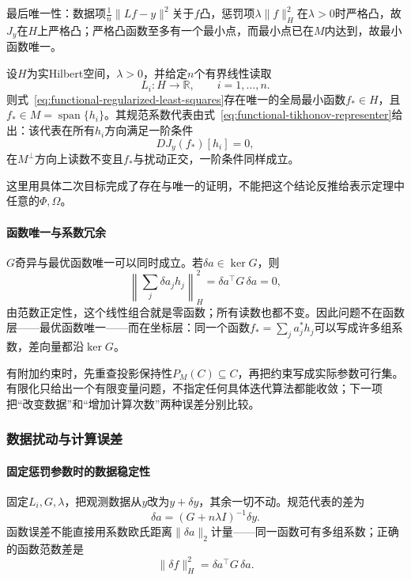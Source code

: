 最后唯一性：数据项$\frac1n\|Lf-y\|^2$关于$f$凸，惩罚项$\lambda\|f\|_H^2$在$\lambda>0$时严格凸，故$J_y$在$H$上严格凸；严格凸函数至多有一个最小点，而最小点已在$M$内达到，故最小函数唯一。

\begin{theorem}[平方读取加二次惩罚的解]\label{thm:functional-tikhonov-solution}
设$H$为实Hilbert空间，$\lambda>0$，并给定$n$个有界线性读取
\[
  L_i:H\to\mathbb R,\qquad i=1,\ldots,n.
\]
则式~\eqref{eq:functional-regularized-least-squares}存在唯一的全局最小函数$f_*\in H$，且$f_*\in M=\operatorname{span}\{h_i\}$。其规范系数代表由式~\eqref{eq:functional-tikhonov-representer}给出：该代表在所有$h_i$方向满足一阶条件
\[
  DJ_y(f_*)[h_i]=0,
\]
在$M^\perp$方向上读数不变且$f_*$与扰动正交，一阶条件同样成立。
\end{theorem}

这里用具体二次目标完成了存在与唯一的证明，不能把这个结论反推给表示定理中任意的$\Phi,\Omega$。

\paragraph{函数唯一与系数冗余}

$G$奇异与最优函数唯一可以同时成立。若$\delta a\in\ker G$，则
\[
  \left\|\sum_j\delta a_jh_j\right\|_H^2
  =\delta a^{\top}G\,\delta a=0,
\]
由范数正定性，这个线性组合就是零函数；所有读数也都不变。因此问题不在函数层——最优函数唯一——而在坐标层：同一个函数$f_*=\sum_ja_j^*h_j$可以写成许多组系数，差向量都沿$\ker G$。

有附加约束时，先重查投影保持性$P_M(C)\subseteq C$，再把约束写成实际参数可行集。有限化只给出一个有限变量问题，不指定任何具体迭代算法都能收敛；下一项把“改变数据”和“增加计算次数”两种误差分别比较。

\subsubsection{数据扰动与计算误差}
\label{subsubsec:finite-fit-stability-computation}

\paragraph{固定惩罚参数时的数据稳定性}

固定$L_i,G,\lambda$，把观测数据从$y$改为$y+\delta y$，其余一切不动。规范代表的差为
\[
  \delta a=(G+n\lambda I)^{-1}\delta y.
\]
函数误差不能直接用系数欧氏距离$\|\delta a\|_2$计量——同一函数可有多组系数；正确的函数范数差是
\[
  \|\delta f\|_H^2=\delta a^{\top}G\,\delta a.
\]

